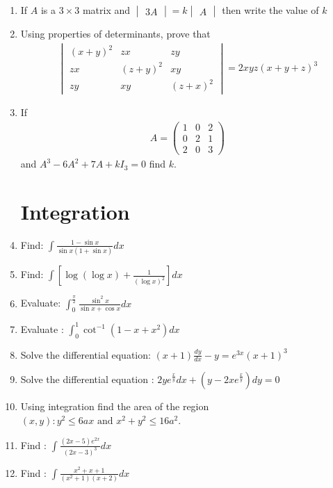 \documentclass[12pt,-letter paper]{article}
\newcommand{\myvec}[1]{\ensuremath{\begin{pmatrix}#1\end{pmatrix}}}
\newcommand{\mydet}[1]{\ensuremath{\begin{vmatrix}#1\end{vmatrix}}}
\providecommand{\brak}[1]{\ensuremath{\left(#1\right)}}
\providecommand{\sbrak}[1]{\ensuremath{{}\left[#1\right]}}
\providecommand{\brak}[1]{\ensuremath{\left(#1\right)}}
\begin{document}
\begin{enumerate}
	\item If $A$ is a $3\times3$ matrix and $\mydet{3A} = k \mydet{A}$ then write the value of $k$

	\item Using properties of determinants, prove that
	\begin{align}
		\mydet{(x + y)^2 & zx & zy \\
		zx & (z+y)^2 & xy \\
		zy & xy & (z+x)^2}
		 = 2xyz (x + y + z)^3
	\end{align}
	
	\item If 
	\begin{align}
		A = \myvec{1 & 0 & 2\\
		0 & 2 & 1 \\
		2 & 0 & 3}
	\end{align}
and $A^3-6A^2+7A+kI_3=0$ find $k$.


\section{Integration}
	\item Find: $\int \frac{1- \sin x}{\sin x (1 + \sin x)} dx$

	\item Find: $\int \sbrak{\log (\log x)+ \frac{1}{(\log x)^2}} dx$

	\item Evaluate: $\int_0^\frac{\pi}{2} \frac{\sin^2x}{\sin x + \cos x} dx$

	\item Evaluate : $ \int_0^1 \cot^{-1}\brak{1 - x + x^2} dx$

	\item Solve the differential equation: $(x + 1) \frac{dy}{dx} - y = e^{3x} (x + 1)^3$ 

	\item Solve the differential equation : $2y e^{\frac{x}{y}}dx + \brak{y - 2x e^{\frac{x}{y}}}dy = 0$

	\item Using integration find the area of the region ${(x, y) : y^2 \leq 6ax \text{ and }
 x^2+y^2 \leq 16a^2}$.



	\item Find : $\int \frac{(2x-5)e^{2x}}{(2x-3)^3} dx$

	\item Find : $\int \frac{x^2 +x +1}{(x^2 + 1)(x + 2)} dx$


\end{enumerate}
\end{document}
